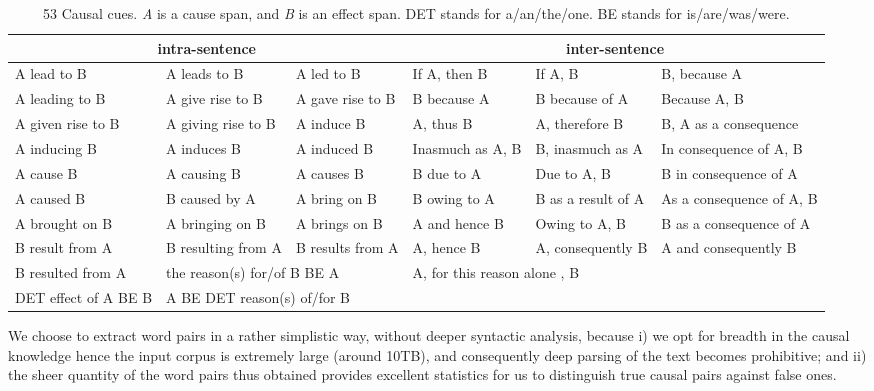 \begin{table*}[th]
\centering
\caption{53 Causal cues. \textit{A} is a cause span, and \textit{B} is an effect span.
DET stands for a/an/the/one. BE stands for is/are/was/were.}
\label{tab:cue}
\small
\begin{tabular}{|l l l|l l l|}
\hline \multicolumn{3}{|c|}{intra-sentence} & \multicolumn{3}{c|}{inter-sentence}\\
\hline \hline
A lead to B & A leads to B & A led to B & If A, then B& If A, B & B, because A \\
A leading to B & A give rise to B & A gave rise to B & B because A & B because of A & Because A, B \\
A given rise to B & A giving rise to B & A induce B & A, thus B & A, therefore B & B, A as a consequence \\
A inducing B & A induces B & A induced B & Inasmuch as A, B & B, inasmuch as A & In consequence of A, B \\
A cause B & A causing B & A causes B & B due to A & Due to A, B & B in consequence of A \\
A caused B & B caused by A & A bring on B & B owing to A & B as a result of A & As a consequence of A, B\\
A brought on B & A bringing on B & A brings on B & A and hence B & Owing to A, B& B as a consequence of A\\
B result from A & B resulting from A &  B results from A & A, hence B & A, consequently B & A and consequently B\\
B resulted from A & \multicolumn{2}{l|}{the reason(s) for/of B BE A} & \multicolumn{3}{|l|}{A, for this reason alone , B} \\
DET effect of A BE B &\multicolumn{2}{l|}{A BE DET reason(s) of/for B} & & & \\
\hline
\end{tabular}
\end{table*}

We choose to extract word pairs in a rather simplistic way, without deeper
syntactic analysis, because i) we opt for breadth in the causal knowledge
hence the input corpus is extremely large (around 10TB), and consequently
deep parsing of the text becomes prohibitive; and ii) the sheer quantity of
the word pairs thus obtained provides excellent statistics for us to
distinguish true causal pairs against false ones.


